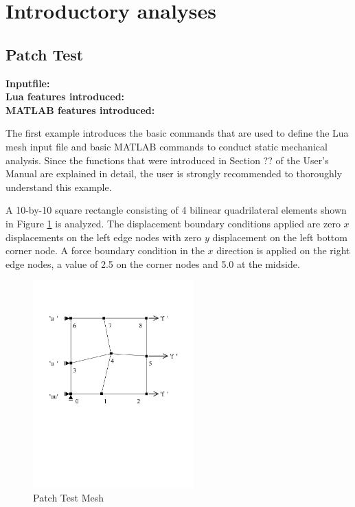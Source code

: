 \newpage
\section{Introductory analyses}
\subsection{Patch Test}
\begin{flushleft}
  \textbf{Inputfile:}
  \\
  \textbf{Lua features introduced:}
   \\
  \textbf{MATLAB features introduced:}
\end{flushleft}

The first example introduces the basic commands 
that are used to define the Lua mesh input file
and basic MATLAB commands to conduct static mechanical 
analysis. Since the functions that were introduced in Section ??
of the User's Manual are explained in detail, the
user is strongly recommended to thoroughly understand
this example.

A 10-by-10 square rectangle consisting of 4 bilinear 
quadrilateral elements shown in Figure \ref{fig:PatchTestMesh}
is analyzed. The displacement boundary conditions applied are
zero $x$ displacements on the left edge nodes
with zero $y$ displacement on the left bottom corner node.
A force boundary condition in the $x$ direction is applied on 
the right edge nodes, a value of 2.5 on the corner nodes and 
5.0 at the midside. 

\begin{figure}[htbp]
  \centering
  \includegraphics[trim = 0mm 10cm 0mm 1cm, clip, height=8cm]{fig/patchtest.pdf}
  \caption{Patch Test Mesh}
  \label{fig:PatchTestMesh}
\end{figure}

